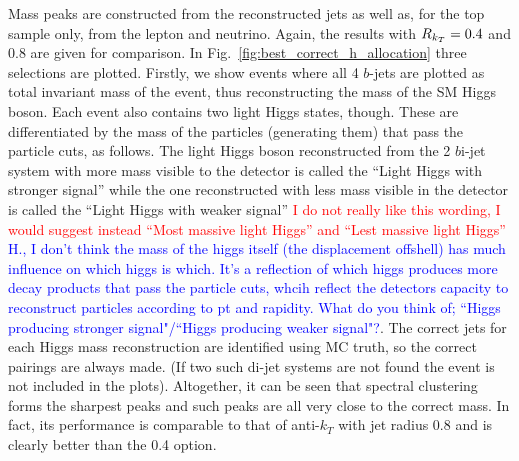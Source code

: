 %


Mass peaks are constructed from the reconstructed jets as well as, for the top sample only, from the lepton and neutrino.
Again, the \antikt{} results  with \(R{}_{k_T} = 0.4\) and \(0.8\) are given for comparison.
In Fig.~\ref{fig:best_correct_h_allocation} three selections are plotted. Firstly, we show events where all 4 $b$-jets  
are plotted as total invariant mass of the event, thus reconstructing the mass of the SM Higgs boson.
Each event also contains two light Higgs states, though. These are differentiated by the mass of the particles (generating them) that pass the particle cuts,
as follows. The light Higgs boson reconstructed from the 2 $b$i-jet system with more mass visible to the detector is called the ``Light Higgs with stronger signal''
while the one reconstructed  with less mass visible in the detector is called the ``Light Higgs with weaker signal'' {\textcolor{red}{I do not really like this wording, I would suggest instead ``Most massive light Higgs'' and ``Lest massive light Higgs''} \textcolor{blue}{H., I don't think the mass of the higgs itself (the displacement offshell) has much influence on which higgs is which. It's a reflection of which higgs produces more decay products that pass the particle cuts, whcih reflect the detectors capacity to reconstruct particles according to pt and rapidity. What do you think of; ``Higgs producing stronger signal"/``Higgs producing weaker signal"?}}.
The correct jets for each Higgs mass reconstruction are identified using MC truth,
so the correct pairings are always made. (If two such di-jet systems are not found the event is not included in the plots).
Altogether, it can be seen that spectral clustering forms the sharpest peaks and such peaks are all very close to the correct mass. In fact, its performance
is comparable to that of anti-$k_T$ with jet radius 0.8 and is clearly better than the 0.4 option. 


